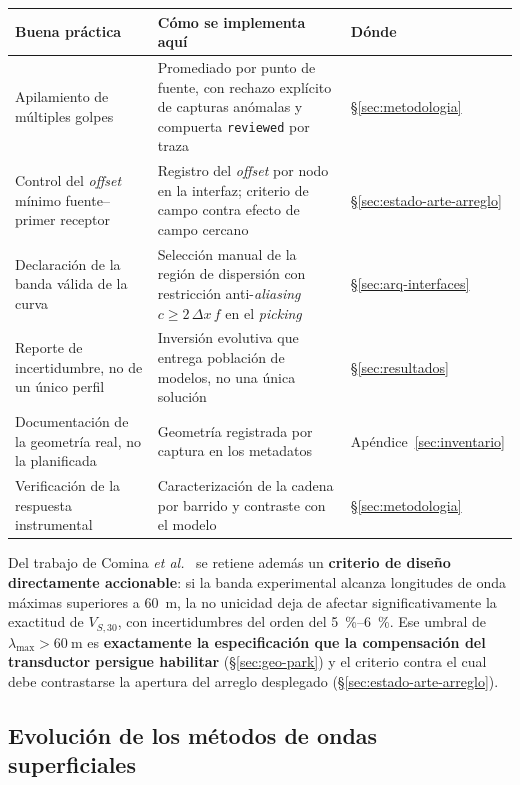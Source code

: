 \begin{center}\footnotesize
\begin{tabularx}{\textwidth}{@{}l X l@{}}
\toprule
Buena pr\'actica & C\'omo se implementa aqu\'i & D\'onde \\
\midrule
Apilamiento de m\'ultiples golpes & Promediado por punto de fuente, con rechazo expl\'icito de capturas an\'omalas y compuerta \texttt{reviewed} por traza & \S\ref{sec:metodologia} \\
Control del \emph{offset} m\'inimo fuente--primer receptor & Registro del \emph{offset} por nodo en la interfaz; criterio de campo contra efecto de campo cercano & \S\ref{sec:estado-arte-arreglo} \\
Declaraci\'on de la banda v\'alida de la curva & Selecci\'on manual de la regi\'on de dispersi\'on con restricci\'on anti-\emph{aliasing} $c\ge 2\,\Delta x\,f$ en el \emph{picking} & \S\ref{sec:arq-interfaces} \\
Reporte de incertidumbre, no de un \'unico perfil & Inversi\'on evolutiva que entrega poblaci\'on de modelos, no una \'unica soluci\'on & \S\ref{sec:resultados} \\
Documentaci\'on de la geometr\'ia real, no la planificada & Geometr\'ia registrada por captura en los metadatos & Ap\'endice~\ref{sec:inventario} \\
Verificaci\'on de la respuesta instrumental & Caracterizaci\'on de la cadena por barrido y contraste con el modelo & \S\ref{sec:metodologia} \\
\bottomrule
\end{tabularx}
\end{center}

Del trabajo de Comina \emph{et al.}~\cite{Comina2011} se retiene adem\'as un
\textbf{criterio de dise\~no directamente accionable}: si la banda experimental alcanza
longitudes de onda m\'aximas superiores a \SI{60}{\meter}, la no unicidad deja de afectar
significativamente la exactitud de $V_{S,30}$, con incertidumbres del orden del
\SIrange{5}{6}{\percent}. Ese umbral de $\lambda_{\max}>\SI{60}{\meter}$ es
\textbf{exactamente la especificaci\'on que la compensaci\'on del transductor
persigue habilitar} (\S\ref{sec:geo-park}) y el criterio contra el cual debe contrastarse
la apertura del arreglo desplegado (\S\ref{sec:estado-arte-arreglo}).

\subsection{Evoluci\'on de los m\'etodos de ondas superficiales}

